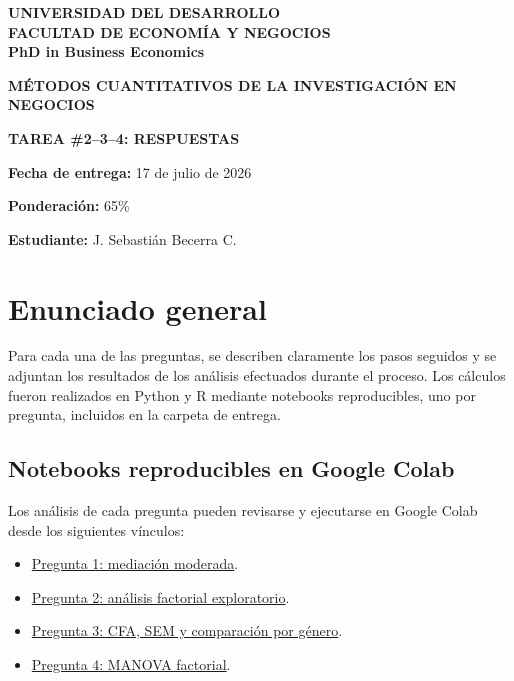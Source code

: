 \documentclass[12pt,letterpaper]{article}
\begin{document}
\begin{center}
{\large \textbf{UNIVERSIDAD DEL DESARROLLO}}\\
{\large \textbf{FACULTAD DE ECONOMÍA Y NEGOCIOS}}\\
{\large \textbf{PhD in Business Economics}}

\vspace{1em}

{\Large \textbf{MÉTODOS CUANTITATIVOS DE LA INVESTIGACIÓN EN NEGOCIOS}}

\vspace{0.7em}

{\large \textbf{TAREA \#2--3--4: RESPUESTAS}}
\end{center}

\vspace{1em}

\textbf{Fecha de entrega:} 17 de julio de 2026

\textbf{Ponderación:} 65\%

\textbf{Estudiante:} J. Sebastián Becerra C.

\vspace{1em}

\section*{Enunciado general}

Para cada una de las preguntas, se describen claramente los pasos seguidos y se adjuntan los resultados de los análisis efectuados durante el proceso. Los cálculos fueron realizados en Python y R mediante notebooks reproducibles, uno por pregunta, incluidos en la carpeta de entrega.

\subsection*{Notebooks reproducibles en Google Colab}

Los análisis de cada pregunta pueden revisarse y ejecutarse en Google Colab desde los siguientes vínculos:
\begin{itemize}\itemsep2pt
\item \href{https://colab.research.google.com/github/sebabecerra/Metodos-Cuantitativos-DEN/blob/main/Tarea2/notebooks/Tarea_2_P1_Mediacion_Moderada.ipynb}{Pregunta 1: mediación moderada}.
\item \href{https://colab.research.google.com/github/sebabecerra/Metodos-Cuantitativos-DEN/blob/main/Tarea2/notebooks/Tarea_2_P2_Analisis_Factorial.ipynb}{Pregunta 2: análisis factorial exploratorio}.
\item \href{https://colab.research.google.com/github/sebabecerra/Metodos-Cuantitativos-DEN/blob/main/Tarea2/notebooks/Tarea_2_P3_SEM.ipynb}{Pregunta 3: CFA, SEM y comparación por género}.
\item \href{https://colab.research.google.com/github/sebabecerra/Metodos-Cuantitativos-DEN/blob/main/Tarea2/notebooks/Tarea_2_P4_MANOVA.ipynb}{Pregunta 4: MANOVA factorial}.
\end{itemize}
\end{document}
